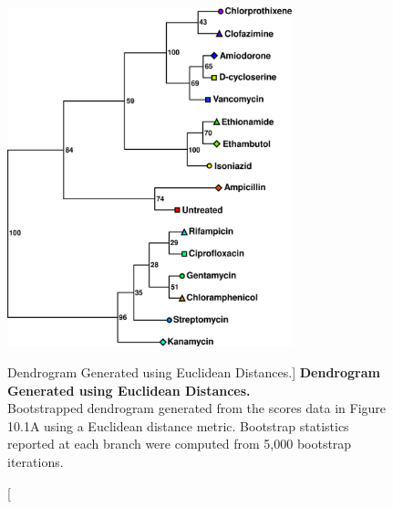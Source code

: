 \begin{figure}
\includegraphics[width=3.25in]{figs/utils/03-tree.png}
\caption
      [Dendrogram Generated using Euclidean Distances.]{
  {\bf Dendrogram Generated using Euclidean Distances.}
  \\
  Bootstrapped dendrogram generated from the scores data in Figure 10.1A using
  a Euclidean distance metric. Bootstrap statistics reported at each branch
  were computed from 5,000 bootstrap iterations.
}
\label{figure.10.3}
\end{figure}

